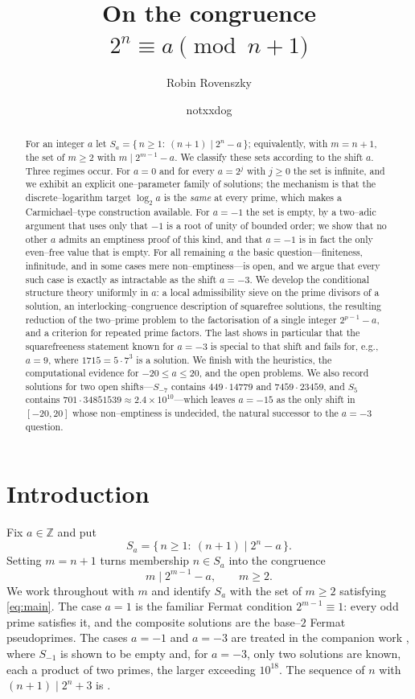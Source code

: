 \documentclass[11pt,reqno]{amsart}
\title[On the congruence $2^{n}\equiv a\pmod{n+1}$]{On the congruence $2^{n}\equiv a\pmod{n+1}$}
\author{Robin Rovenszky}
\author{notxxdog}
\date{}
\theoremstyle{plain}
\theoremstyle{definition}
\theoremstyle{remark}
\newcommand{\Z}{\mathbb{Z}}
\newcommand{\dvd}{\mid}
\newcommand{\Sa}{S_a}
\begin{document}
\begin{abstract}
For an integer $a$ let $\Sa=\{\,n\ge 1:\ (n+1)\dvd 2^{n}-a\,\}$; equivalently, with $m=n+1$, the set of $m\ge2$ with $m\dvd 2^{m-1}-a$. We classify these sets according to the shift $a$. Three regimes occur. For $a=0$ and for every $a=2^{j}$ with $j\ge0$ the set is infinite, and we exhibit an explicit one--parameter family of solutions; the mechanism is that the discrete--logarithm target $\log_2 a$ is the \emph{same} at every prime, which makes a Carmichael--type construction available. For $a=-1$ the set is empty, by a two--adic argument that uses only that $-1$ is a root of unity of bounded order; we show that no other $a$ admits an emptiness proof of this kind, and that $a=-1$ is in fact the only even--free value that is empty. For all remaining $a$ the basic question---finiteness, infinitude, and in some cases mere non--emptiness---is open, and we argue that every such case is exactly as intractable as the shift $a=-3$. We develop the conditional structure theory uniformly in $a$: a local admissibility sieve on the prime divisors of a solution, an interlocking--congruence description of squarefree solutions, the resulting reduction of the two--prime problem to the factorisation of a single integer $2^{p-1}-a$, and a criterion for repeated prime factors. The last shows in particular that the squarefreeness statement known for $a=-3$ is special to that shift and fails for, e.g., $a=9$, where $1715=5\cdot7^{3}$ is a solution. We finish with the heuristics, the computational evidence for $-20\le a\le 20$, and the open problems. We also record solutions for two open shifts---$S_{-7}$ contains $449\cdot14779$ and $7459\cdot23459$, and $S_5$ contains $701\cdot34851539\approx2.4\times10^{10}$---which leaves $a=-15$ as the only shift in $[-20,20]$ whose non--emptiness is undecided, the natural successor to the $a=-3$ question.
\end{abstract}

\maketitle
\tableofcontents

\section{Introduction}

Fix $a\in\Z$ and put
\[
\Sa=\{\,n\ge1:\ (n+1)\dvd 2^{n}-a\,\}.
\]
Setting $m=n+1$ turns membership $n\in\Sa$ into the congruence
\begin{equation}\label{eq:main}
m\dvd 2^{m-1}-a,\qquad m\ge2.
\end{equation}
We work throughout with $m$ and identify $\Sa$ with the set of $m\ge2$ satisfying \eqref{eq:main}. The case $a=1$ is the familiar Fermat condition $2^{m-1}\equiv1$: every odd prime satisfies it, and the composite solutions are the base--$2$ Fermat pseudoprimes. The cases $a=-1$ and $a=-3$ are treated in the companion work \cite{prior}, where $S_{-1}$ is shown to be empty and, for $a=-3$, only two solutions are known, each a product of two primes, the larger exceeding $10^{18}$. The sequence of $n$ with $(n+1)\dvd2^{n}+3$ is \cite[A245728]{oeis}.
\end{document}
